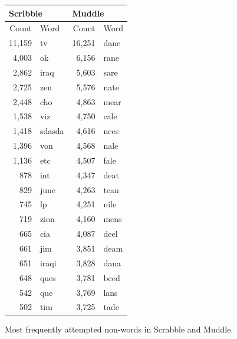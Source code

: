 \documentclass[twocolumn]{article}
\begin{document}
\begin{figure}

\begin{tabular}{|rl@{\qquad}rl|}
\multicolumn{2}{l}{{\bf \large Scribble}} &
\multicolumn{2}{l}{{\bf \large Muddle}} \\
\hline
Count & Word & Count & Word \\
\hline
11,159 &  tv         &     16,251 &  dane    \\
4,003  &  ok         &     6,156  &  rane    \\
2,862  &  iraq       &     5,603  &  sare    \\
2,725  &  zen        &     5,576  &  nate    \\
2,448  &  cho        &     4,863  &  mear    \\
1,538  &  viz        &     4,750  &  cale    \\
1,418  &  sdasda     &     4,616  &  nees    \\
1,396  &  von        &     4,568  &  nale    \\
1,136  &  etc        &     4,507  &  fale    \\
878    &  int        &     4,347  &  deat    \\
829    &  june       &     4,263  &  tean    \\
745    &  lp         &     4,251  &  nile    \\
719    &  zion       &     4,160  &  mens    \\
665    &  cia        &     4,087  &  deel    \\
661    &  jim        &     3,851  &  deam    \\
651    &  iraqi      &     3,828  &  dana    \\
648    &  ques       &     3,781  &  beed    \\
542    &  que        &     3,769  &  lans    \\
502    &  tim        &     3,725  &  tade    \\
\hline
\end{tabular}
\caption{Most frequently attempted non-words in Scrabble and Muddle.}
\label{fig:mostfrequentfake}
\end{figure}
\end{document}
